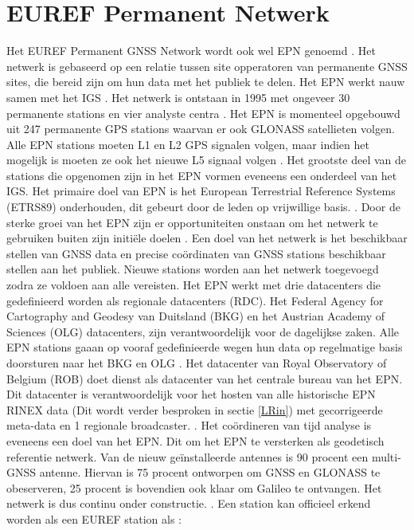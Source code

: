 \section{EUREF Permanent Netwerk}
\label{LEPN}
Het EUREF Permanent GNSS Network wordt ook wel EPN genoemd \cite{LBibEPN3,LBibEPN2,LBibEPN}. Het netwerk is gebaseerd op een relatie tussen site opperatoren van permanente GNSS sites, die bereid zijn om hun data met het publiek te delen. Het EPN werkt nauw samen met het IGS \cite{LBibEPN3}. Het netwerk is ontstaan in 1995 met ongeveer 30 permanente stations en vier analyste centra \cite{LBibEPN5}. Het EPN is momenteel opgebouwd uit 247 permanente GPS stations waarvan er ook GLONASS satellieten volgen. Alle EPN stations moeten L1 en L2 GPS signalen volgen, maar indien het mogelijk is moeten ze ook het nieuwe L5 signaal volgen \cite{LBibEPN4}. Het grootste deel van de stations die opgenomen zijn in het EPN vormen eveneens een onderdeel van het IGS. Het primaire doel van EPN is het European Terrestrial Reference Systems (ETRS89) onderhouden, dit gebeurt door de leden op vrijwillige basis. \cite{LBibEPN, LBibEPN2}. Door de sterke groei van het EPN zijn er opportuniteiten onstaan om het netwerk te gebruiken buiten zijn initi\"ele doelen \cite{LBibEPN5}. Een doel van het netwerk is het beschikbaar stellen van GNSS data en precise co\"ordinaten van GNSS stations beschikbaar stellen aan het publiek. Nieuwe stations worden aan het netwerk toegevoegd zodra ze voldoen aan alle vereisten. Het EPN werkt met drie datacenters die gedefinieerd worden als regionale datacenters (RDC). Het Federal Agency for Cartography and Geodesy van Duitsland (BKG) en het Austrian Academy of Sciences (OLG)  datacenters, zijn verantwoordelijk voor de dagelijkse zaken. Alle EPN stations gaaan op vooraf gedefinieerde wegen hun data op regelmatige basis doorsturen naar het BKG en OLG \cite{LBibEPN2}. Het datacenter van Royal Observatory of Belgium (ROB) doet dienst als datacenter van het centrale bureau van het EPN. Dit datacenter is verantwoordelijk voor het hosten van alle historische EPN RINEX data (Dit wordt verder besproken in sectie \ref{LRin}) met gecorrigeerde meta-data en 1 regionale broadcaster. \cite{LBibEPN2,LBibEPN3}. Het co\"ordineren van tijd analyse is eveneens een doel van het EPN. Dit om het EPN te versterken als geodetisch referentie netwerk. Van de nieuw ge\"installeerde antennes is 90 procent een multi-GNSS antenne. Hiervan is 75 procent ontworpen om GNSS en GLONASS te obeserveren, 25 procent is bovendien ook klaar om Galileo te ontvangen. Het netwerk is dus continu onder constructie. \cite{LBibEPN3}. Een station kan officieel erkend worden als een EUREF station als \cite{LBibGNSS8}:
